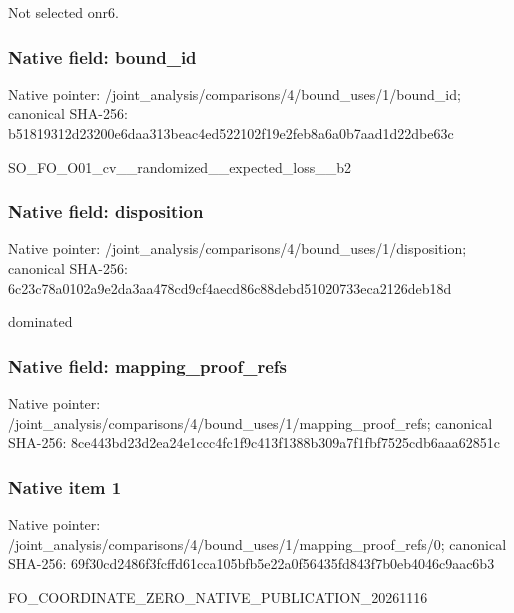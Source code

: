 \documentclass[10pt,a4paper]{article}
\begin{document}
\begingroup\raggedright\sloppy Not selected onr6.\par\endgroup

\subsubsection{Native field: bound\_\allowbreak{}id}
Native pointer: /joint\_\allowbreak{}analysis/comparisons/4/bound\_\allowbreak{}uses/1/bound\_\allowbreak{}id; canonical SHA-256: b51819312d23200e6daa313beac4ed522102f19e2feb8a6a0b7aad1d22dbe63c

\begingroup\raggedright\sloppy SO\_\allowbreak{}FO\_\allowbreak{}O01\_\allowbreak{}cv\_\allowbreak{}\_\allowbreak{}randomized\_\allowbreak{}\_\allowbreak{}expected\_\allowbreak{}loss\_\allowbreak{}\_\allowbreak{}b2\par\endgroup

\subsubsection{Native field: disposition}
Native pointer: /joint\_\allowbreak{}analysis/comparisons/4/bound\_\allowbreak{}uses/1/disposition; canonical SHA-256: 6c23c78a0102a9e2da3aa478cd9cf4aecd86c88debd51020733eca2126deb18d

\begingroup\raggedright\sloppy dominated\par\endgroup

\subsubsection{Native field: mapping\_\allowbreak{}proof\_\allowbreak{}refs}
Native pointer: /joint\_\allowbreak{}analysis/comparisons/4/bound\_\allowbreak{}uses/1/mapping\_\allowbreak{}proof\_\allowbreak{}refs; canonical SHA-256: 8ce443bd23d2ea24e1ccc4fc1f9c413f1388b309a7f1fbf7525cdb6aaa62851c

\subsubsection{Native item 1}
Native pointer: /joint\_\allowbreak{}analysis/comparisons/4/bound\_\allowbreak{}uses/1/mapping\_\allowbreak{}proof\_\allowbreak{}refs/0; canonical SHA-256: 69f30cd2486f3fcffd61cca105bfb5e22a0f56435fd843f7b0eb4046c9aac6b3

\begingroup\raggedright\sloppy FO\_\allowbreak{}COORDINATE\_\allowbreak{}ZERO\_\allowbreak{}NATIVE\_\allowbreak{}PUBLICATION\_\allowbreak{}20261116\par\endgroup
\end{document}
